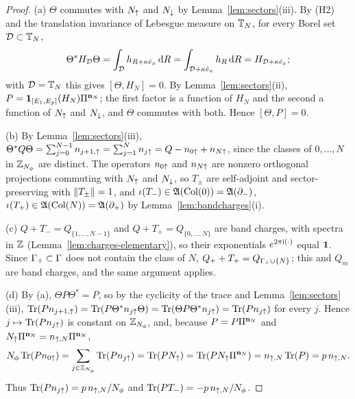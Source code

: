 \begin{proof}
(a) $\Theta$ commutes with $N_{\uparrow}$ and $N_{\downarrow}$ by Lemma~\ref{lem:sectors}(iii). By (H2) and the translation invariance of
Lebesgue measure on $\mathbb{T}_N$, for every Borel set $\mathcal D\subset\mathbb{T}_N$,
\[
\Theta^*H_{\mathcal D}\Theta=\int_{\mathcal D}h_{R+\kappa\hat{e}_x}\,\mathrm{d} R=\int_{\mathcal D+\kappa\hat{e}_x}h_R\,\mathrm{d} R=H_{\mathcal D+\kappa\hat{e}_x};
\]
with $\mathcal D=\mathbb{T}_N$ this gives $[\Theta,H_N]=0$. By Lemma~\ref{lem:sectors}(ii), $P=\mathbf{1}_{[E_1,E_p]}(H_N)\Pi^{\mathbf{n}_N}$; the
first factor is a function of $H_N$ and the second a function of $N_{\uparrow}$ and $N_{\downarrow}$, and $\Theta$ commutes with both.
Hence $[\Theta,P]=0$.

(b) By Lemma~\ref{lem:sectors}(iii), $\Theta^*Q\Theta=\sum_{j=0}^{N-1}n_{j+1,{\uparrow}}=\sum_{j=1}^Nn_{j{\uparrow}}=Q-n_{0{\uparrow}}+n_{N{\uparrow}}$,
since the classes of $0,\dots,N$ in $\mathbb{Z}_{N_{\phi}}$ are distinct. The operators $n_{0{\uparrow}}$ and $n_{N{\uparrow}}$ are nonzero
orthogonal projections commuting with $N_{\uparrow}$ and $N_{\downarrow}$, so $T_\pm$ are self-adjoint and sector-preserving with
$\lVert T_\pm\rVert=1$, and $\iota(T_-)\in\mathfrak{A}(\mathrm{Col}(0))=\mathfrak{A}(\partial_{-})$, $\iota(T_+)\in\mathfrak{A}(\mathrm{Col}(N))=\mathfrak{A}(\partial_{+})$ by
Lemma~\ref{lem:bandcharges}(i).

(c) $Q+T_-=Q_{\{1,\dots,N-1\}}$ and $Q+T_+=Q_{\{0,\dots,N\}}$ are band charges, with spectra in $\mathbb{Z}$
(Lemma~\ref{lem:charges-elementary}), so their exponentials $e^{2\pi\mathrm{i}(\cdot)}$ equal $\mathbf{1}$. Since $\Gamma_{+}\subset\Gamma$ does not
contain the class of $N$, $Q_++T_+=Q_{\Gamma_{+}\cup\{N\}}$; this and $Q_m$ are band charges, and the same argument applies.

(d) By (a), $\Theta P\Theta^*=P$, so by the cyclicity of the trace and Lemma~\ref{lem:sectors}(iii),
$\operatorname{Tr}(Pn_{j+1,{\uparrow}})=\operatorname{Tr}(P\Theta^*n_{j{\uparrow}}\Theta)=\operatorname{Tr}(\Theta P\Theta^*n_{j{\uparrow}})=\operatorname{Tr}(Pn_{j{\uparrow}})$ for every $j$. Hence
$j\mapsto\operatorname{Tr}(Pn_{j{\uparrow}})$ is constant on $\mathbb{Z}_{N_{\phi}}$, and, because $P=P\Pi^{\mathbf{n}_N}$ and
$N_{\uparrow}\Pi^{\mathbf{n}_N}=n_{{\uparrow},N}\Pi^{\mathbf{n}_N}$,
\[
N_{\phi}\operatorname{Tr}(Pn_{0{\uparrow}})=\sum_{j\in\mathbb{Z}_{N_{\phi}}}\operatorname{Tr}(Pn_{j{\uparrow}})=\operatorname{Tr}(PN_{\uparrow})=\operatorname{Tr}(PN_{\uparrow}\Pi^{\mathbf{n}_N})=n_{{\uparrow},N}\operatorname{Tr}(P)=p\,n_{{\uparrow},N} .
\]
Thus $\operatorname{Tr}(Pn_{j{\uparrow}})=p\,n_{{\uparrow},N}/N_{\phi}$ and $\operatorname{Tr}(PT_-)=-p\,n_{{\uparrow},N}/N_{\phi}$.


\end{proof}
